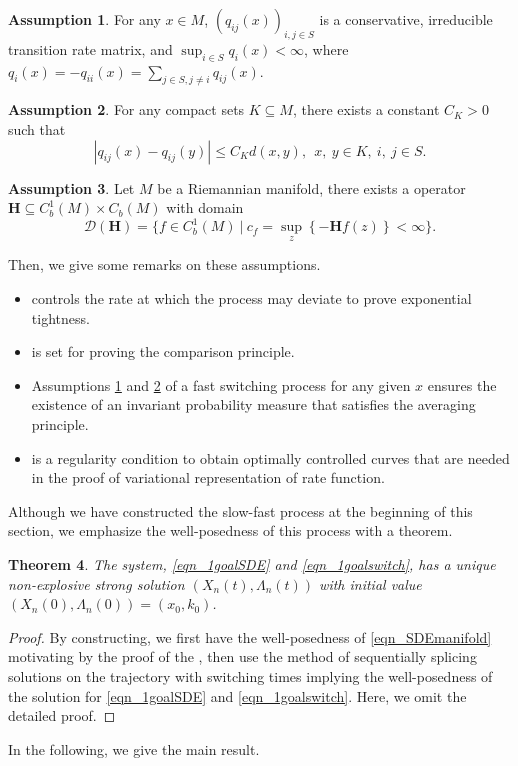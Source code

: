 \documentclass[a4paper]{article}
\numberwithin{equation}{section}
\newtheorem{theorem}{Theorem}[section]
\theoremstyle{definition}
\newtheorem{assumption}[theorem]{Assumption}
\begin{document}
\begin{assumption}\label{asm_conservative_manifold}
	For any $x\in M$, $(q_{ij}(x))_{i,j\in S}$ is a conservative, irreducible transition rate matrix, and $\sup_{i\in S}q_i(x)<\infty$, where $q_i(x)=-q_{ii}(x)=\sum_{j\in S,j\neq i}q_{ij}(x)$.
\end{assumption}

\begin{assumption}\label{asm_conti_manifold}
	For any compact sets $K\subseteq M$, there exists a constant $C_K>0$ such that 
	\begin{equation*}
		|q_{ij}(x)-q_{ij}(y)|\leq C_Kd(x,y),~~x,~y\in K,~i,~j \in S.
	\end{equation*}
\end{assumption}

\begin{assumption}\label{ass_bfH_bounded}
    Let $M$ be a Riemannian manifold, there exists a operator $\mathbf{H}\subseteq C_b^1(M)\times C_b(M)$ with domain
    \begin{equation*}
        \mathcal{D}(\mathbf{H})=\{f\in C^1_b(M)~| ~ c_f = \sup_{z} \left\{ -\mathbf{H}f(z) \right\} < \infty \}.
    \end{equation*}
\end{assumption}
Then, we give some remarks on these assumptions.
\begin{itemize}
    
   \item {} controls the rate at which the process may deviate to prove exponential tightness.
  \item  {} is set for proving the comparison principle.
\item
 Assumptions \ref{asm_conservative_manifold} and \ref{asm_conti_manifold} of a fast switching process for any given $x$ ensures the existence of an invariant probability measure that satisfies the averaging principle.
\item {} is a regularity condition to obtain optimally controlled curves that are needed in the proof of variational representation of rate function.
\end{itemize}
Although we have constructed the slow-fast process at the beginning of this section, we emphasize the well-posedness of this process with a theorem.
\begin{theorem}
	The system, \eqref{eqn_1goalSDE} and \eqref{eqn_1goalswitch}, has a  unique non-explosive strong solution $(X_n(t),\Lambda_n(t))$ with initial value $(X_n(0),\Lambda_n(0))=(x_0,k_0)$. 
\end{theorem}
\begin{proof}
	By constructing, we first have  the well-posedness of \eqref{eqn_SDEmanifold} motivating by the proof of the \cite[Proposition 2.4]{HKX2023}, then use the method of sequentially splicing solutions on the trajectory with switching times implying the well-posedness of the solution for \eqref{eqn_1goalSDE} and \eqref{eqn_1goalswitch}. Here, we omit the detailed proof. 
\end{proof}
In the following, we give the main result. 
\end{document}
